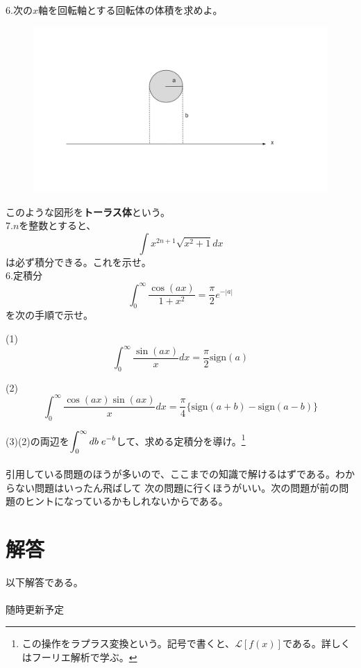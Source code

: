 \documentclass[a4j,dvipdfmx]{jsarticle}
\begin{document}
6.次の$x$軸を回転軸とする回転体の体積を求めよ。
\begin{figure}[h]
    \centering
    \includegraphics[width=15cm,scale=5]{img/回転体問題.png}
\end{figure}
このような図形を\textbf{トーラス体}という。\\

7.$n$を整数とすると、
\begin{equation*}
    \int x^{2n+1}\sqrt{x^2+1}dx
\end{equation*}
は必ず積分できる。これを示せ。\\

6.定積分
\begin{equation*}
    \int_0^\infty\frac{\cos(ax)}{1+x^2}=\frac{\pi}{2}e^{-|a|}
\end{equation*}
を次の手順で示せ。

(1)
\begin{equation*}
    \int_0^\infty \frac{\sin(ax)}{x}dx=\frac{\pi}{2}\mbox{sign}(a)    
\end{equation*}

(2)
\begin{equation*}
    \int_0^\infty \frac{\cos(ax)\sin(ax)}{x}dx=\frac{\pi}{4}\{\mbox{sign}(a+b)-\mbox{sign}(a-b)\}
\end{equation*}

(3)\hspace{2mm}(2)の両辺を$\displaystyle \int_0^\infty db\hspace{1mm}e^{-b}$して、求める定積分を導け。\footnote{この操作をラプラス変換という。記号で書くと、$\mathcal{L}[f(x)]$である。詳しくはフーリエ解析で学ぶ。}\\
\\
引用している問題のほうが多いので、ここまでの知識で解けるはずである。わからない問題はいったん飛ばして
次の問題に行くほうがいい。次の問題が前の問題のヒントになっているかもしれないからである。
\newpage
\part{解答}
以下解答である。
\\
\hrulefill\\

{\huge 随時更新予定}
\end{document}
